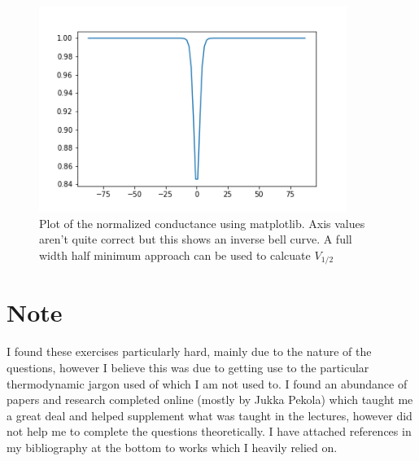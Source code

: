 \documentclass[12pt]{article}
\begin{document}
\begin{enumerate}
\begin{enumerate}
    \begin{figure}[h]
        \centering
        \includegraphics[width=10cm]{plot.png}
        \caption{Plot of the normalized conductance using matplotlib. Axis values aren't quite correct but this shows an inverse bell curve. A full width half minimum approach can be used to calcuate $V_{1/2}$}
        \end{figure}
\end{enumerate}



\end{enumerate}

\section{Note}
I found these exercises particularly hard, mainly due to the nature of the questions, however I believe this was due to getting use to the particular thermodynamic jargon used of which I am not used to. I found an abundance of papers and research completed online (mostly by Jukka Pekola) which taught me a great deal and helped supplement what was taught in the lectures, however did not help me to complete the questions theoretically. I have attached references in my bibliography at the bottom to works which I heavily relied on. 
\end{document}
